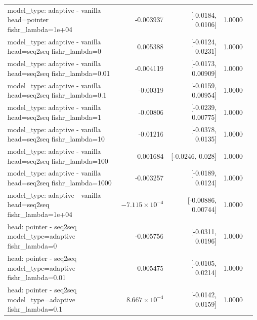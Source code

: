 \documentclass[10pt]{article}
\makeatletter
\newcommand{\stackcell}[1]{\begin{tabular}[t]{@{}l@{}}#1\end{tabular}}
\makeatother
\begin{document}
{\begin{longtable}{lrrrl}
\stackcell{model\_type: adaptive - vanilla\\\footnotesize head=pointer fishr\_lambda=1e+04 } & -0.003937 & [-0.0184, 0.0106] & 1.0000 & \\
\stackcell{model\_type: adaptive - vanilla\\\footnotesize head=seq2seq fishr\_lambda=0 } & 0.005388 & [-0.0124, 0.0231] & 1.0000 & \\
\stackcell{model\_type: adaptive - vanilla\\\footnotesize head=seq2seq fishr\_lambda=0.01 } & -0.004119 & [-0.0173, 0.00909] & 1.0000 & \\
\stackcell{model\_type: adaptive - vanilla\\\footnotesize head=seq2seq fishr\_lambda=0.1 } & -0.00319 & [-0.0159, 0.00954] & 1.0000 & \\
\stackcell{model\_type: adaptive - vanilla\\\footnotesize head=seq2seq fishr\_lambda=1 } & -0.00806 & [-0.0239, 0.00775] & 1.0000 & \\
\stackcell{model\_type: adaptive - vanilla\\\footnotesize head=seq2seq fishr\_lambda=10 } & -0.01216 & [-0.0378, 0.0135] & 1.0000 & \\
\stackcell{model\_type: adaptive - vanilla\\\footnotesize head=seq2seq fishr\_lambda=100 } & 0.001684 & [-0.0246, 0.028] & 1.0000 & \\
\stackcell{model\_type: adaptive - vanilla\\\footnotesize head=seq2seq fishr\_lambda=1000 } & -0.003257 & [-0.0189, 0.0124] & 1.0000 & \\
\stackcell{model\_type: adaptive - vanilla\\\footnotesize head=seq2seq fishr\_lambda=1e+04 } & $-7.115\times10^{-4}$ & [-0.00886, 0.00744] & 1.0000 & \\
\stackcell{head: pointer - seq2seq\\\footnotesize model\_type=adaptive fishr\_lambda=0 } & -0.005756 & [-0.0311, 0.0196] & 1.0000 & \\
\stackcell{head: pointer - seq2seq\\\footnotesize model\_type=adaptive fishr\_lambda=0.01 } & 0.005475 & [-0.0105, 0.0214] & 1.0000 & \\
\stackcell{head: pointer - seq2seq\\\footnotesize model\_type=adaptive fishr\_lambda=0.1 } & $8.667\times10^{-4}$ & [-0.0142, 0.0159] & 1.0000 & \\

\end{longtable}}
\end{document}
